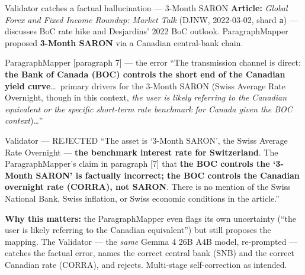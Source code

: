 \documentclass[10pt,aspectratio=169]{beamer}
\begin{document}
\begin{frame}{Validator catches a factual hallucination --- 3-Month SARON}
  \scriptsize
  \textbf{Article:} \emph{Global Forex and Fixed Income Roundup: Market Talk} \hfill (DJNW,
  2022-03-02, shard \texttt{a}) --- discusses BoC rate hike and Desjardins' 2022 BoC outlook.
  ParagraphMapper proposed \textbf{3-Month SARON} via a Canadian central-bank chain.

  \vspace{0.3em}
  \begin{block}{ParagraphMapper [paragraph 7] --- the error}
    \scriptsize
    ``The transmission channel is direct: \textbf{the Bank of Canada (BOC) controls the short
    end of the Canadian yield curve}\ldots\ primary drivers for the 3-Month SARON (Swiss
    Average Rate Overnight, though in this context, \emph{the user is likely referring to the
    Canadian equivalent or the specific short-term rate benchmark for Canada given the BOC
    context})\ldots''
  \end{block}

  \begin{block}{Validator --- \textcolor{red!70!black}{REJECTED}}
    \scriptsize
    ``The asset is `3-Month SARON', the Swiss Average Rate Overnight --- \textbf{the benchmark
    interest rate for Switzerland}. The ParagraphMapper's claim in paragraph [7] that
    \textbf{the BOC controls the `3-Month SARON' is factually incorrect; the BOC controls the
    Canadian overnight rate (CORRA), not SARON}. There is no mention of the Swiss National
    Bank, Swiss inflation, or Swiss economic conditions in the article.''
  \end{block}

  \vspace{0.2em}
  \textcolor{goodgreen}{\textbf{Why this matters:}} the ParagraphMapper even flags its own
  uncertainty (``the user is likely referring to the Canadian equivalent'') but still proposes
  the mapping. The Validator --- the \emph{same} Gemma 4 26B A4B model, re-prompted --- catches
  the factual error, names the correct central bank (SNB) and the correct Canadian rate
  (CORRA), and rejects. Multi-stage self-correction as intended.
\end{frame}
\end{document}
